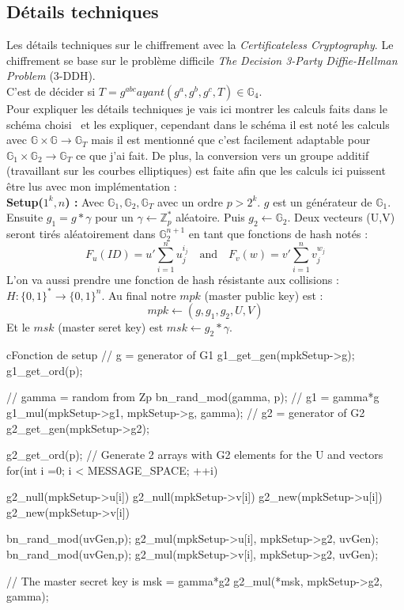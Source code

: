 \subsection{Détails techniques}
Les détails techniques sur le chiffrement avec la \textit{Certificateless Cryptography}.
Le chiffrement se base sur le problème difficile \textit{The Decision 3-Party Diffie-Hellman Problem} (3-DDH). \\C'est de décider si $T =g^{abc} ayant (g^a, g^b, g^c, T) \in \mathbb{G}_4$.\\
Pour expliquer les détails techniques je vais ici montrer les calculs faits dans le schéma choisi~\cite{DBLP:conf/pkc/DentLP08} et les expliquer, cependant dans le schéma il est noté les calculs avec $\mathbb{G} \times \mathbb{G} \rightarrow \mathbb{G}_T$ mais il est mentionné que c'est facilement adaptable pour $\mathbb{G}_1 \times \mathbb{G}_2 \rightarrow \mathbb{G}_T$ ce que j'ai fait. De plus, la conversion vers un groupe additif (travaillant sur les courbes elliptiques) est faite afin que les calculs ici puissent être lus avec mon implémentation :\\
\textbf{Setup($1^k, n$) :} Avec $\mathbb{G}_1, \mathbb{G}_2, \mathbb{G}_T$ avec un ordre $p > 2^k$. $g$ est un générateur de $\mathbb{G}_1$. Ensuite  $g_1 = g * \gamma$ pour un $\gamma \leftarrow  \mathbb{Z}_p^*$ aléatoire. Puis $g_2 \leftarrow \mathbb{G}_2$. Deux vecteurs (U,V) seront tirés aléatoirement dans $\mathbb{G}_2^{n+1}$ en tant que fonctions de hash notés :
\[F_u(ID) = u' \sum_{i=1}^{n} u_j^{i_j}\quad\mathrm{and}\quad F_v(w) = v' \sum_{i=1}^{n} v_j^{w_j}\]
L'on va aussi prendre une fonction de hash résistante aux collisions : $H : \{0,1\}^* \rightarrow \{0,1\}^n$. Au final notre $mpk$ (master public key) est :
\[mpk \leftarrow (g, g_1, g_2, U, V)\]
Et le $msk$ (master seret key) est $msk \leftarrow g_2*\gamma$.\\
\begin{sourcebox}{c}{Fonction de setup}
	// g = generator of G1
	g1_get_gen(mpkSetup->g);
	g1_get_ord(p);
	
	// gamma = random from Zp
	bn_rand_mod(gamma, p);
	// g1 = gamma*g
	g1_mul(mpkSetup->g1, mpkSetup->g, gamma);
	// g2 = generator of G2
	g2_get_gen(mpkSetup->g2);
	
	g2_get_ord(p);
	// Generate 2 arrays with G2 elements for the U and  vectors
	for(int i =0; i < MESSAGE_SPACE; ++i){
		g2_null(mpkSetup->u[i])
		g2_null(mpkSetup->v[i])
		g2_new(mpkSetup->u[i])
		g2_new(mpkSetup->v[i])
		
		bn_rand_mod(uvGen,p);
		g2_mul(mpkSetup->u[i], mpkSetup->g2, uvGen);
		bn_rand_mod(uvGen,p);
		g2_mul(mpkSetup->v[i], mpkSetup->g2, uvGen);
	}
	
	// The master secret key is msk = gamma*g2
	g2_mul(*msk, mpkSetup->g2, gamma);
\end{sourcebox}
